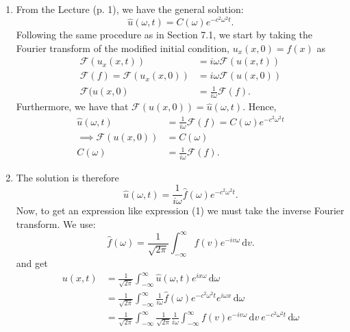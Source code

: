 \begin{derivation}
  \begin{enumerate}[label=\alph*)]
    \item From the Lecture (p. 1), we have the general solution:
      \begin{equation*}
        \hat{u}(\omega, t) = C(\omega) e^{-c^2 \omega^2 t}
      .\end{equation*}
      Following the same procedure as in Section 7.1, we start by taking the Fourier transform of the modified initial condition, $u_x(x,0) = f(x)$ as
      \begin{align*}
        \mathcal{F}(u_x(x,t)) &= i \omega \mathcal{F}(u(x,t)) \\
        \mathcal{F}(f) = \mathcal{F}(u_x(x,0)) &= i \omega\mathcal{F}(u(x,0)) \\
        \mathcal{F}(u(x,0) &= \frac{1}{i \omega} \mathcal{F}(f)
      .\end{align*}
      Furthermore, we have that $\mathcal{F}(u(x,0)) = \hat{u}(\omega, t)$.
      Hence,
      \begin{align*}
        \hat{u}(\omega, t) &= \frac{1}{i \omega} \mathcal{F}(f) = C (\omega) e^{-c^2 \omega^2 t} \\
        \implies \mathcal{F}(u(x,0)) &=  C (\omega) \\
        C(\omega) &= \frac{1}{i \omega} \mathcal{F}(f)
      .\end{align*}
    \item The solution is therefore
      \begin{equation*}
        \hat{u} (\omega,t) = \frac{1}{i \omega} \hat{f}(\omega) e^{-c^2 \omega^2 t}
      .\end{equation*}
      Now, to get an expression like expression (1) we must take the inverse Fourier transform.
      We use:
      \begin{equation*}
        \hat{f}(\omega) = \frac{1}{\sqrt{2\pi}} \int_{-\infty}^{\infty} f(v) e^{- i v \omega} \, \mathrm{d}v
      .\end{equation*}
      and get
      \begin{align*}
        u(x, t) &= \frac{1}{\sqrt{2\pi}} \int_{-\infty}^{\infty} \hat{u}(\omega, t) e^{i x \omega} \, \mathrm{d}\omega \\
                &= \frac{1}{\sqrt{2\pi}} \int_{-\infty}^{\infty} \frac{1}{i \omega}\hat{f}(\omega) e^{-c^2 \omega^2 t} e^{i \omega x} \, \mathrm{d}\omega \\
                &= \frac{1}{\sqrt{2\pi}} \int_{-\infty}^{\infty} \frac{1}{\sqrt{2\pi}} \frac{1}{i \omega} \int_{-\infty}^{\infty} f(v) e^{-i v \omega} \, \mathrm{d}v \: e^{- c^2 \omega^2 t} \, \mathrm{d}\omega \\

\end{align*}
\end{enumerate}
\end{derivation}
